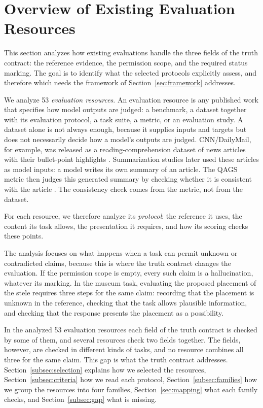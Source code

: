 \documentclass{clv2025}
\begin{document}
\section{Overview of Existing Evaluation Resources}\label{sec:methodology}

This section analyzes how existing evaluations handle the three fields of
the truth contract: the reference evidence, the permission scope, and the
required status marking. The goal is to identify what the selected protocols
explicitly assess, and therefore which needs the framework of
Section~\ref{sec:framework} addresses.

We analyze 53 \emph{evaluation resources}. An evaluation resource is any
published work that specifies how model outputs are judged: a benchmark, a
dataset together with its evaluation protocol, a task suite, a metric, or
an evaluation study. A dataset alone is not always enough, because it
supplies inputs and targets but does not necessarily decide how a model's
outputs are judged. CNN/DailyMail, for example, was released as a
reading-comprehension dataset of news articles with their bullet-point
highlights \citep{hermann_teaching_2015}. Summarization studies later used
these articles as model inputs: a model writes its own summary of an
article. The QAGS metric then judges this generated summary by checking
whether it is consistent with the article \citep{wang_asking_2020}. The
consistency check comes from the metric, not from the dataset.

For each resource, we therefore analyze its
\emph{protocol}: the reference it uses, the content its task allows, the
presentation it requires, and how its scoring checks these points.

The analysis focuses on what happens when a task can permit unknown or
contradicted claims, because this is where the truth contract changes the
evaluation. If the permission scope is empty, every such claim is a
hallucination, whatever its marking. In the museum task, evaluating the
proposed placement of the stele requires three steps for the same
claim: recording that the placement is unknown in the reference, checking
that the task allows plausible information, and checking that the
response presents the placement as a possibility.

In the analyzed 53 evaluation resources each field of the truth contract is
checked by some of them, and several resources check two fields together.
The fields, however, are checked in different kinds of tasks, and no
resource combines all three for the same claim. This gap is what the truth
contract addresses. Section~\ref{subsec:selection} explains how we selected
the resources, Section~\ref{subsec:criteria} how we read each protocol,
Section~\ref{subsec:families} how we group the resources into four
families, Section~\ref{sec:mapping} what each family checks, and
Section~\ref{subsec:gap} what is missing.
\end{document}
